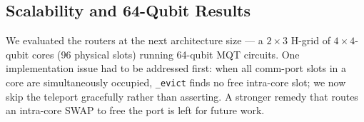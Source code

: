 \documentclass[conference]{IEEEtran}
\begin{document}
\subsection{Scalability and 64-Qubit Results}
\label{sec:scalability}

We evaluated the routers at the next architecture size --- a $2\!\times\!3$
H-grid of $4\!\times\!4$-qubit cores (96 physical slots) running 64-qubit
MQT circuits.
One implementation issue had to be addressed first: when all comm-port
slots in a core are simultaneously occupied, \texttt{\_evict} finds no
free intra-core slot; we now skip the teleport gracefully rather than
asserting.
A stronger remedy that routes an intra-core SWAP to free the port is left
for future work.
\end{document}
